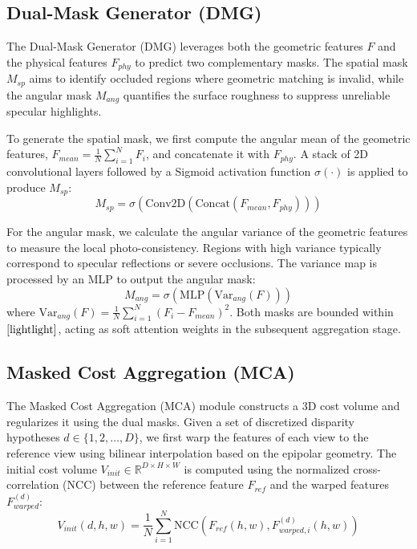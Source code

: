 \documentclass[lettersize,journal]{IEEEtran}
\begin{document}
\subsection{Dual-Mask Generator (DMG)}

The Dual-Mask Generator (DMG) leverages both the geometric features $F$ and the physical features $F_{phy}$ to predict two complementary masks. The spatial mask $M_{sp}$ aims to identify occluded regions where geometric matching is invalid, while the angular mask $M_{ang}$ quantifies the surface roughness to suppress unreliable specular highlights.

To generate the spatial mask, we first compute the angular mean of the geometric features, $F_{mean} = \frac{1}{N}\sum_{i=1}^N F_i$, and concatenate it with $F_{phy}$. A stack of 2D convolutional layers followed by a Sigmoid activation function $\sigma(\cdot)$ is applied to produce $M_{sp}$:
\begin{equation}
\label{eq:eq9}
M_{sp} = \sigma\left(\text{Conv2D}\left(\text{Concat}(F_{mean}, F_{phy})\right)\right)
\end{equation}

For the angular mask, we calculate the angular variance of the geometric features to measure the local photo-consistency. Regions with high variance typically correspond to specular reflections or severe occlusions. The variance map is processed by an MLP to output the angular mask:
\begin{equation}
\label{eq:eq10}
M_{ang} = \sigma\left(\text{MLP}\left(\text{Var}_{ang}(F)\right)\right)
\end{equation}
where $\text{Var}_{ang}(F) = \frac{1}{N}\sum_{i=1}^N (F_i - F_{mean})^2$. Both masks are bounded within $\cite{lightlight}$, acting as soft attention weights in the subsequent aggregation stage.

\subsection{Masked Cost Aggregation (MCA)}

The Masked Cost Aggregation (MCA) module constructs a 3D cost volume and regularizes it using the dual masks. Given a set of discretized disparity hypotheses $d \in \{1, 2, \dots, D\}$, we first warp the features of each view to the reference view using bilinear interpolation based on the epipolar geometry. The initial cost volume $V_{init} \in \mathbb{R}^{D \times H \times W}$ is computed using the normalized cross-correlation (NCC) between the reference feature $F_{ref}$ and the warped features $F_{warped}^{(d)}$:
\begin{equation}
\label{eq:eq11}
V_{init}(d, h, w) = \frac{1}{N} \sum_{i=1}^{N} \text{NCC}\left(F_{ref}(h,w), F_{warped, i}^{(d)}(h,w)\right)
\end{equation}
\end{document}
